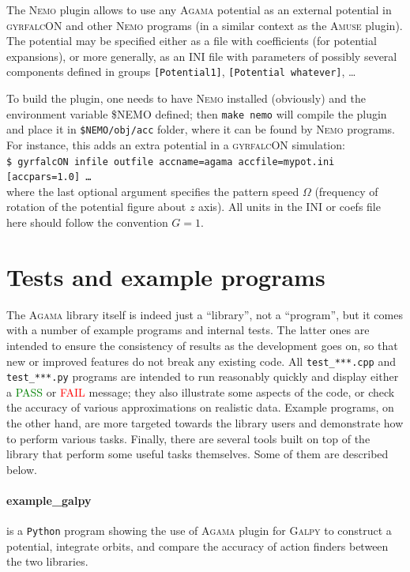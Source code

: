 \documentclass[12pt]{article}
\newcommand{\Agama}{\textsc{Agama}\xspace}
\newcommand{\Amuse}{\textsc{Amuse}\xspace}
\newcommand{\Galpy}{\textsc{Galpy}\xspace}
\newcommand{\Nemo} {\textsc{Nemo}\xspace}
\newcommand{\Python}{\texttt{Python}\xspace}
\newcommand{\ppp}[1]{\textcolor{darkolive} {\texttt{#1}}}
\begin{document}
The \Nemo plugin allows to use any \Agama potential as an external potential in \textsc{gyrfalcON} and other \Nemo programs (in a similar context as the \Amuse plugin). The potential may be specified either as a file with coefficients (for potential expansions), or more generally, as an INI file with parameters of possibly several components defined in groups \ppp{[Potential1]}, \ppp{[Potential whatever]}, \dots

To build the plugin, one needs to have \Nemo installed (obviously) and the environment variable \$NEMO defined; then \texttt{make nemo} will compile the plugin and place it in \texttt{\$NEMO/obj/acc} folder, where it can be found by \Nemo programs. For instance, this adds an extra potential in a \textsc{gyrfalcON}  simulation:\\
\texttt{\$ gyrfalcON infile outfile accname=agama accfile=mypot.ini [accpars=1.0] \dots}\\
where the last optional argument specifies the pattern speed $\Omega$ (frequency of rotation of the potential figure about $z$ axis). All units in the INI or coefs file here should follow the convention $G=1$.


\section{Tests and example programs}  \label{sec:ExamplesTests}

The \Agama library itself is indeed just a ``library'', not a ``program'', but it comes with a number of example programs and internal tests. The latter ones are intended to ensure the consistency of results as the development goes on, so that new or improved features do not break any existing code. All \texttt{test_***.cpp} and \texttt{test_***.py} programs are intended to run reasonably quickly and display either a \textcolor{Green}{PASS} or \textcolor{Red}{FAIL} message; they also illustrate some aspects of the code, or check the accuracy of various approximations on realistic data. Example programs, on the other hand, are more targeted towards the library users and demonstrate how to perform various tasks. Finally, there are several tools built on top of the library that perform some useful tasks themselves. Some of them are described below.

\paragraph{example_galpy} is a \Python program showing the use of \Agama plugin for \Galpy to construct a potential, integrate orbits, and compare the accuracy of action finders between the two libraries. 
\end{document}

